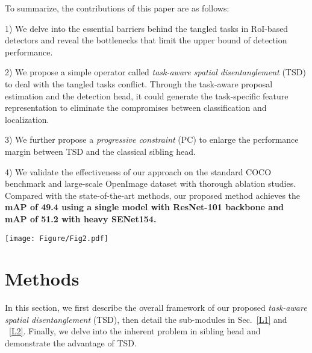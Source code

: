 \documentclass[10pt,twocolumn,letterpaper]{article}
\def \algfullname{\emph{task-aware spatial disentanglement}}
\def \algname{TSD}
\def \loss{PC}
\begin{document}
To summarize, the contributions of this paper are as follows:

1) We delve into the essential barriers behind the tangled tasks in RoI-based detectors and reveal the bottlenecks that limit the upper bound of detection performance.

2) We propose a simple operator called \algfullname{} (\algname{}) to deal with the tangled tasks conflict. Through the task-aware proposal estimation and the detection head, it could generate the task-specific feature representation to eliminate the compromises between classification and localization.

3) We further propose a \emph{progressive constraint} (\loss{}) to enlarge the performance margin between \algname{} and the classical sibling head.

4) We validate the effectiveness of our approach on the standard COCO benchmark and large-scale OpenImage dataset with thorough ablation studies. 
Compared with the state-of-the-art methods,
our proposed method achieves the \textbf{mAP of 49.4 using 
a single model with ResNet-101 backbone and mAP of 51.2 with heavy SENet154.}






\begin{figure*}[t!]
\centering
\texttt{[image: Figure/Fig2.pdf]}
   \caption{Illustration of the proposed \algname{} cooperated with Faster RCNN~\cite{ren2015faster}. Input images are first fed into the FPN backbone and then, region proposal  is generated by RPN. \algname{} adopts the RoI feature of  as input and estimates the derived proposals  and  for classification and localization. Finally, two parallel branches are used to predict specific category and regress precise box, respectively.}
\label{fig:intro}
\end{figure*}









\section{Methods}
In this section, we first describe the overall framework of our proposed \algfullname{} (\algname{}), then detail the sub-modules in Sec.~\ref{L1} and ~\ref{L2}. Finally, we delve into the inherent problem in sibling head and demonstrate the advantage of \algname{}.
\end{document}
